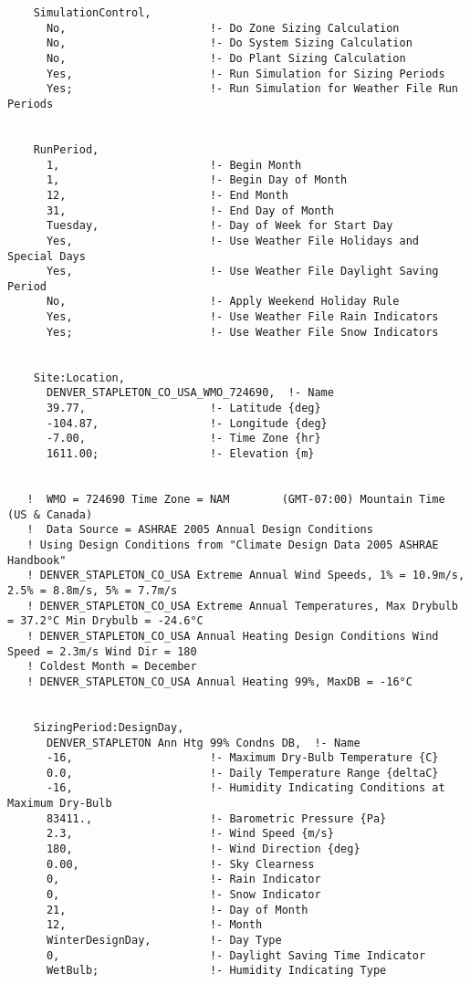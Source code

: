 \begin{lstlisting}
    SimulationControl,
      No,                      !- Do Zone Sizing Calculation
      No,                      !- Do System Sizing Calculation
      No,                      !- Do Plant Sizing Calculation
      Yes,                     !- Run Simulation for Sizing Periods
      Yes;                     !- Run Simulation for Weather File Run Periods


    RunPeriod,
      1,                       !- Begin Month
      1,                       !- Begin Day of Month
      12,                      !- End Month
      31,                      !- End Day of Month
      Tuesday,                 !- Day of Week for Start Day
      Yes,                     !- Use Weather File Holidays and Special Days
      Yes,                     !- Use Weather File Daylight Saving Period
      No,                      !- Apply Weekend Holiday Rule
      Yes,                     !- Use Weather File Rain Indicators
      Yes;                     !- Use Weather File Snow Indicators


    Site:Location,
      DENVER_STAPLETON_CO_USA_WMO_724690,  !- Name
      39.77,                   !- Latitude {deg}
      -104.87,                 !- Longitude {deg}
      -7.00,                   !- Time Zone {hr}
      1611.00;                 !- Elevation {m}


   !  WMO = 724690 Time Zone = NAM        (GMT-07:00) Mountain Time (US & Canada)
   !  Data Source = ASHRAE 2005 Annual Design Conditions
   ! Using Design Conditions from "Climate Design Data 2005 ASHRAE Handbook"
   ! DENVER_STAPLETON_CO_USA Extreme Annual Wind Speeds, 1% = 10.9m/s, 2.5% = 8.8m/s, 5% = 7.7m/s
   ! DENVER_STAPLETON_CO_USA Extreme Annual Temperatures, Max Drybulb = 37.2°C Min Drybulb = -24.6°C
   ! DENVER_STAPLETON_CO_USA Annual Heating Design Conditions Wind Speed = 2.3m/s Wind Dir = 180
   ! Coldest Month = December
   ! DENVER_STAPLETON_CO_USA Annual Heating 99%, MaxDB = -16°C


    SizingPeriod:DesignDay,
      DENVER_STAPLETON Ann Htg 99% Condns DB,  !- Name
      -16,                     !- Maximum Dry-Bulb Temperature {C}
      0.0,                     !- Daily Temperature Range {deltaC}
      -16,                     !- Humidity Indicating Conditions at Maximum Dry-Bulb
      83411.,                  !- Barometric Pressure {Pa}
      2.3,                     !- Wind Speed {m/s}
      180,                     !- Wind Direction {deg}
      0.00,                    !- Sky Clearness
      0,                       !- Rain Indicator
      0,                       !- Snow Indicator
      21,                      !- Day of Month
      12,                      !- Month
      WinterDesignDay,         !- Day Type
      0,                       !- Daylight Saving Time Indicator
      WetBulb;                 !- Humidity Indicating Type



\end{lstlisting}
